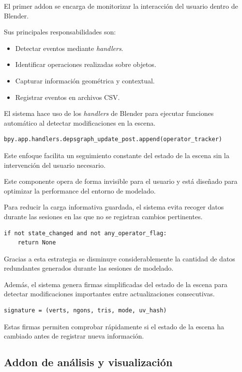 El primer addon se encarga de monitorizar la interacción del usuario dentro de Blender.

Sus principales responsabilidades son:

\begin{itemize}
    \item Detectar eventos mediante \textit{handlers}.
    \item Identificar operaciones realizadas sobre objetos.
    \item Capturar información geométrica y contextual.
    \item Registrar eventos en archivos CSV.
\end{itemize}

El sistema hace uso de los \textit{handlers} de Blender para ejecutar funciones automático al detectar modificaciones en la escena.

\begin{verbatim}
bpy.app.handlers.depsgraph_update_post.append(operator_tracker)
\end{verbatim}

Este enfoque facilita un seguimiento constante del estado de la escena sin la intervención del usuario necesario.

Este componente opera de forma invisible para el usuario y está diseñado para optimizar la performance del entorno de modelado.

Para reducir la carga informativa guardada, el sistema evita recoger datos durante las sesiones en las que no se registran cambios pertinentes.

\begin{verbatim}
if not state_changed and not any_operator_flag:
    return None
\end{verbatim}

Gracias a esta estrategia se disminuye considerablemente la cantidad de datos redundantes generados durante las sesiones de modelado.

Además, el sistema genera firmas simplificadas del estado de la escena para detectar modificaciones importantes entre actualizaciones consecutivas.

\begin{verbatim}
signature = (verts, ngons, tris, mode, uv_hash)
\end{verbatim}

Estas firmas permiten comprobar rápidamente si el estado de la escena ha cambiado antes de registrar nueva información.

\subsection{Addon de análisis y visualización}

